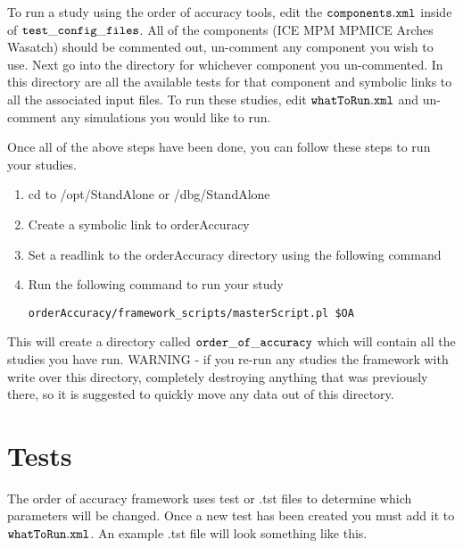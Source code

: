 To run a study using the order of accuracy tools, edit the $\TT{components.xml}$ inside of $\TT{test\_config\_files}$. All of the components (ICE MPM MPMICE Arches Wasatch) should be commented out, un-comment any component you wish to use. Next go into the directory for whichever component you un-commented. In this directory are all the available tests for that component and symbolic links to all the associated input files. To run these studies, edit $\TT{whatToRun.xml}$ and un-comment any simulations you would like to run.

Once all of the above steps have been done, you can follow these steps to run your studies.
\begin{enumerate}

\item cd to /opt/StandAlone or /dbg/StandAlone
\item Create a symbolic link to orderAccuracy \\
\item Set a readlink to the orderAccuracy directory using the following command \\
\item Run the following command to run your study
\begin{verbatim}
orderAccuracy/framework_scripts/masterScript.pl $OA
\end{verbatim}

\end{enumerate}

This will create a directory called $\TT{order\_of\_accuracy}$ which will contain all the studies you have run. WARNING - if you re-run any studies the framework with write over this directory, completely destroying anything that was previously there, so it is suggested to quickly move any data out of this directory.

\section{Tests}

The order of accuracy framework uses test or .tst files to determine which parameters will be changed. Once a new test has been created you must add it to $\TT{whatToRun.xml}$. An example .tst file will look something like this.

